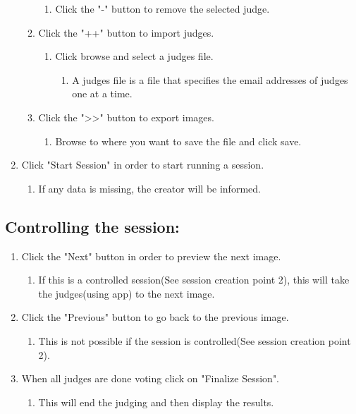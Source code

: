 \documentclass[10pt,a4paper]{article}
\begin{document}
\begin{enumerate}
\begin{enumerate}
\begin{enumerate}
\item Click the "-" button to remove the selected judge.
\end{enumerate}
\item Click the "++" button to import judges.
\begin{enumerate}
\item Click browse and select a judges file.
\begin{enumerate}
\item A judges file is a file that specifies the email addresses of judges one at a time.
\end{enumerate}
\end{enumerate}
\item Click the ">>" button to export images.
\begin{enumerate}
\item Browse to where you want to save the file and click save.
\end{enumerate}
\end{enumerate}
\item Click "Start Session" in order to start running a session.
\begin{enumerate}
\item If any data is missing, the creator will be informed.
\end{enumerate}
\end{enumerate}
\subsection{Controlling the session:}
\begin{enumerate}
\item Click the "Next" button in order to preview the next image.
\begin{enumerate}
\item If this is a controlled session(See session creation point 2), this will take the judges(using app) to the next image.
\end{enumerate}
\item Click the "Previous" button to go back to the previous image.
\begin{enumerate}
\item This is not possible if the session is controlled(See session creation point 2).
\end{enumerate}
\item When all judges are done voting click on "Finalize Session".
\begin{enumerate}
\item This will end the judging and then display the results.
\end{enumerate}
\end{enumerate}
\end{document}
